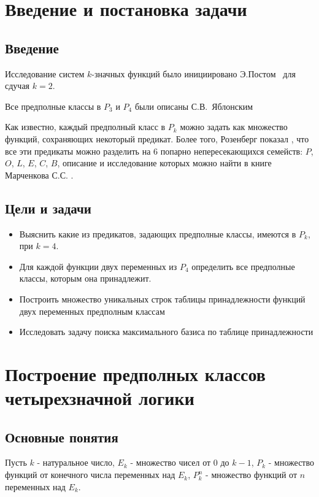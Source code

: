 \documentclass[a4paper,14pt]{extreport}
\begin{document}
\newpage
\tableofcontents
\newpage
\chapter{ Введение и постановка задачи }

\section{Введение}
Исследование систем $k$-значных функций было инициировано Э.Постом~\cite{post1,post2} для сдучая $k=2$.

Все предполные классы в $P_3$ и $P_4$ были описаны С.В.~Яблонским\cite{yabl}

Как известно, каждый предполный класс в $P_k$ можно задать как множество функций, сохраняющих некоторый предикат. Более того, Розенберг показал \cite{roz1, roz2}, что все эти предикаты можно разделить на 6 попарно непересекающихся семейств: $P$, $O$, $L$, $E$, $C$, $B$, описание и исследование которых можно найти в книге Марченкова С.С. \cite{march}. 

\section{Цели и задачи}

\begin{itemize}
\item Выяснить какие из предикатов, задающих предполные классы, имеются в $P_k$, при $k=4$.
\item Для каждой функции двух переменных из $P_4$ определить все предполные классы, которым она принадлежит.
\item Построить множество уникальных строк таблицы принадлежности функций двух переменных предполным классам
\item Исследовать задачу поиска максимального базиса по таблице принадлежности
\end{itemize}

 
\newpage
\chapter{Построение предполных классов четырехзначной логики}
\section{Основные понятия}
Пусть $k$ - натуральное число, $E_k$ - множество чисел от 0 до $k-1$, $P_k$ - множество функций от конечного числа переменных над $E_k$, $P_k^n$ - множество функций от $n$ переменных над $E_k$.  
\end{document}
